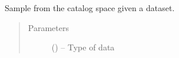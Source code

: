 \documentclass[letterpaper,10pt,english]{sphinxmanual}
\begin{document}
\begin{fulllineitems}
\label{index:pcat.main.init}
Sample from the catalog space given a dataset.
\begin{quote}\begin{description}
\item[{Parameters}] \leavevmode
{} () -- Type of data

\end{description}\end{quote}

\end{fulllineitems}




\renewcommand{\indexname}{Index}
\printindex
\end{document}
